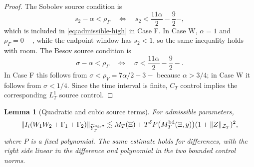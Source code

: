 \documentclass[10pt]{amsart}
\numberwithin{equation}{section}
\theoremstyle{plain}
\newtheorem{lemma}[theorem]{Lemma}
\theoremstyle{definition}
\theoremstyle{remark}
\newcommand{\calZ}{\mathcal{Z}}
\begin{document}
\begin{proof}
The Sobolev source condition is
\[
        s_2-\alpha<\rho_\Gamma
        \quad\Longleftrightarrow\quad
        s_2<\frac{11\alpha}{2}-\frac92-,
\]
which is included in \eqref{eq:admissible-high} in Case F.  In Case W, $\alpha=1$ and $\rho_\Gamma=0-$, while the endpoint window has $s_2<1$, so the same inequality holds with room.  The Besov source condition is
\[
        \sigma-\alpha<\rho_\Gamma
        \quad\Longleftrightarrow\quad
        \sigma<\frac{11\alpha}{2}-\frac92-.
\]
In Case F this follows from $\sigma<\rho_V=7\alpha/2-3-$ because $\alpha>3/4$; in Case W it follows from $\sigma<1/4$.  Since the time interval is finite, $C_T$ control implies the corresponding $L_T^1$ source control.
\end{proof}


\begin{lemma}[Quadratic and cubic source terms]\label{lem:quadratic-Y}
For admissible parameters,
\begin{equation}\label{eq:quadratic-total-estimate}
\|I_i(W_1W_2+\Gamma_1+\Gamma_2)\|_{\widetilde Y_T^{s_2,\sigma}}
\lesssim M_T(\Xi)
 +T^\delta P\bigl(M_T^{\rm bd}(\Xi,y)\bigr)(1+\|Z\|_{\calZ_T})^2,
\end{equation}
where $P$ is a fixed polynomial.  The same estimate holds for differences, with the right side linear in the difference and polynomial in the two bounded control norms.
\end{lemma}
\end{document}
